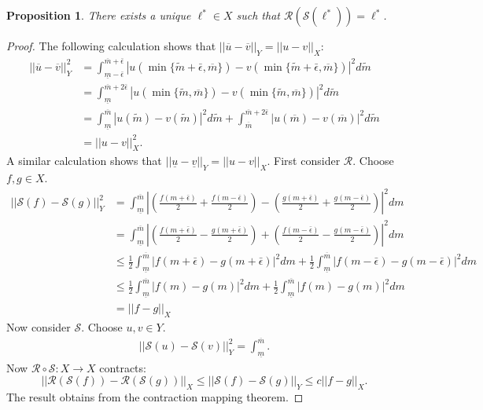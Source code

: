 \documentclass[12pt]{article}
\newtheorem{proposition}{Proposition}
\begin{document}
\begin{proposition}
There exists a unique $\ell^{*}\in X$ such that $\mathcal{R}(\mathcal{S}(\ell^{*}))=\ell^{*}$. 
\end{proposition}
\begin{proof}
The following calculation shows that $||\overline{u}-\overline{v}||_{Y}=||u-v||_{X}$:
\begin{align}
||\overline{u}-\overline{v}||_{Y}^{2}&=\int_{\underline{m}-\bar{\epsilon}}^{\overline{m}+\bar{\epsilon}}{|u(\min\{\tilde{m}+\bar{\epsilon},\overline{m}\})-v(\min\{\tilde{m}+\bar{\epsilon},\overline{m}\})|^{2}d\tilde{m}}\\
&=\int_{\underline{m}}^{\overline{m}+2\bar{\epsilon}}{|u(\min\{\tilde{m},\overline{m}\})-v(\min\{\tilde{m},\overline{m}\})|^{2}d\tilde{m}}\\
&=\int_{\underline{m}}^{\overline{m}}{|u(\tilde{m})-v(\tilde{m})|^{2}d\tilde{m}}+\int_{\overline{m}}^{\overline{m}+2\bar{\epsilon}}{|u(\overline{m})-v(\overline{m})|^{2}d\tilde{m}}\\
&=||u-v||_{X}^{2}.
\end{align}
A similar calculation shows that $||\underline{u}-\underline{v}||_{Y}=||u-v||_{X}$. First consider $\mathcal{R}$. Choose $f,g\in X$. 
\begin{align}
||\mathcal{S}(f)-\mathcal{S}(g)||_{Y}^{2}&=\int_{\underline{m}}^{\overline{m}}{\left|\left(\frac{f(m+\bar{\epsilon})}{2}+\frac{f(m-\bar{\epsilon})}{2}\right)-\left(\frac{g(m+\bar{\epsilon})}{2}+\frac{g(m-\bar{\epsilon})}{2}\right)\right|^{2}dm}\\
&=\int_{\underline{m}}^{\overline{m}}{\left|\left(\frac{f(m+\bar{\epsilon})}{2}-\frac{g(m+\bar{\epsilon})}{2}\right)+\left(\frac{f(m-\bar{\epsilon})}{2}-\frac{g(m-\bar{\epsilon})}{2}\right)\right|^{2}dm}\\
&\leq\frac{1}{2}\int_{\underline{m}}^{\overline{m}}{|f(m+\bar{\epsilon})-g(m+\bar{\epsilon})|^{2}dm}+\frac{1}{2}\int_{\underline{m}}^{\overline{m}}{|f(m-\bar{\epsilon})-g(m-\bar{\epsilon})|^{2}dm}\\
&\leq\frac{1}{2}\int_{\underline{m}}^{\overline{m}}{|f(m)-g(m)|^{2}dm}+\frac{1}{2}\int_{\underline{m}}^{\overline{m}}{|f(m)-g(m)|^{2}dm}\\
&=||f-g||_{X}
\end{align}
Now consider $\mathcal{S}$. Choose $u,v\in Y$. 
\begin{align}
||\mathcal{S}(u)-\mathcal{S}(v)||_{Y}^{2}=\int_{\underline{m}}^{\overline{m}}{}.
\end{align}
Now $\mathcal{R}\circ\mathcal{S}:X\rightarrow X$ contracts:
\begin{equation}
||\mathcal{R}(\mathcal{S}(f))-\mathcal{R}(\mathcal{S}(g))||_{X}\leq||\mathcal{S}(f)-\mathcal{S}(g)||_{Y}\leq c||f-g||_{X}. 
\end{equation}
The result obtains from the contraction mapping theorem. 
\end{proof}
\end{document}
